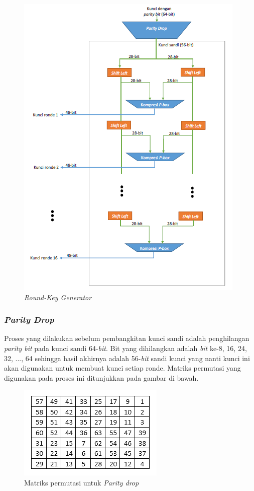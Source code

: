 \begin{figure}[ht]
	\includegraphics[scale=0.8]{Gambar/key_generation2}
	\centering
	\caption{\textit{Round-Key Generator}}
\end{figure}

\subsubsection{\textit{Parity Drop}}
Proses yang dilakukan sebelum pembangkitan kunci sandi adalah penghilangan \textit{parity bit} pada kunci sandi 64-\textit{bit}. Bit yang dihilangkan adalah \textit{bit} ke-8, 16, 24, 32, ..., 64 sehingga hasil akhirnya adalah 56-\textit{bit} sandi kunci yang nanti kunci ini akan digunakan untuk membuat kunci setiap ronde. Matriks permutasi yang digunakan pada proses ini ditunjukkan pada gambar di bawah.

\begin{figure}[ht]
	\includegraphics[scale=0.8]{Gambar/parity_drop}
	\centering
	\caption{Matriks permutasi untuk \textit{Parity drop}}
\end{figure}

